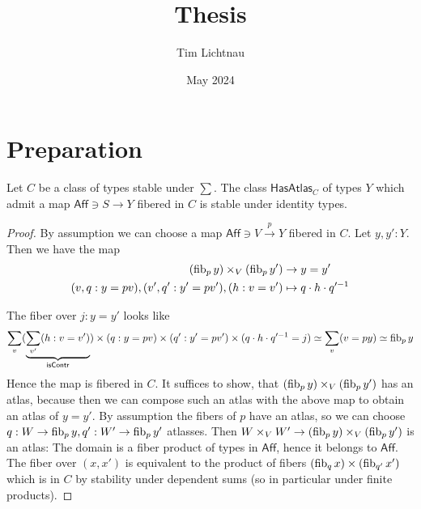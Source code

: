\documentclass{article}
\title{Thesis}
\author{Tim Lichtnau }
\date{May 2024}
\newcommand{\Aff}{\mathsf{Aff}}
\begin{document}
\newtheorem*{warning}{Warning}
\newtheorem*{why}{Why I did it this way}
\newtheorem*{think}{Think about}
\maketitle
\tableofcontents


\section{Preparation}


\begin{lemma}{\label{lemma:havingAbstractAtlasClosedUnderId}}
	Let $C$ be a class of types stable under $\sum$. %
	The class $\mathsf{HasAtlas}_C$ of types $Y$ which admit a map $\Aff \ni S \to Y$ fibered in $C$ is stable under identity types. %
\end{lemma}
\begin{proof}
	
	By assumption we can choose a map $\Aff \ni V \overset{p}{\to} Y$ fibered in $C$. Let $y,y' : Y$.  Then we have the map
	\begin{align*}
		(\operatorname{fib}_p y) \times_V (\operatorname{fib}_p y') &\to y = y' \\
		(v , q : y = p v) , (v', q' : y' = p v') , (h : v = v') &\mapsto q \cdot h \cdot q'^{-1}
	\end{align*}
	
	The fiber over $j : y = y'$ looks like  %
	\[
	\sum_{v}  ( \underbrace{\sum_{v'} (h : v = v')}_{\mathsf{isContr}}) \times (q : y = p v) \times (q'  : y' = p v') \times (q \cdot h \cdot q'^{-1} = j) \simeq \sum_v (v = py) \simeq \operatorname{fib}_p y
	\]
	Hence the map is fibered in $C$. It suffices to show, that	$(\operatorname{fib}_p y) \times_V (\operatorname{fib}_p y')$ has an atlas, because then we can compose such an atlas with the above map to obtain an atlas of $y = y'$.
	By assumption the fibers of $p$ have an atlas, so we can choose $q : W \to \operatorname{fib}_p y, q' : W' \to \operatorname{fib}_p y'$ atlasses. Then $W \times_V W' \to (\operatorname{fib}_p y) \times_V (\operatorname{fib}_p y')$ is an atlas: The domain is a fiber product of types in $\Aff$, hence it belongs to $\Aff$. The fiber over $(x,x')$ is equivalent to the product of fibers $(\operatorname{fib}_q x) \times (\operatorname{fib}_{q'} x')$ which is in $C$ by stability under dependent sums (so in particular under finite products).
	
\end{proof}
\end{document}
